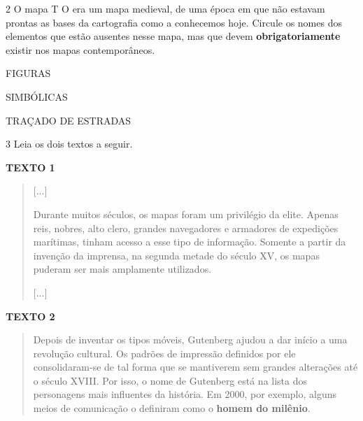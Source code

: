 \num{2} O mapa T O era um mapa medieval, de uma época em que não estavam prontas as
bases da cartografia como a conhecemos hoje. Circule os nomes dos elementos que estão ausentes nesse mapa, mas que devem
\textbf{obrigatoriamente} existir nos mapas contemporâneos.

\begin{multicols}{2}

FIGURAS


SIMBÓLICAS

TRAÇADO DE ESTRADAS
\end{multicols}


\num{3} Leia os dois textos a seguir.

\textbf{TEXTO 1}
\begin{quote}

{[}...{]}

Durante muitos séculos, os mapas foram um privilégio da elite.
Apenas reis, nobres, alto clero, grandes navegadores e armadores de
expedições marítimas, tinham acesso a esse tipo de informação. Somente a
partir da invenção da imprensa, na segunda metade do século XV, os mapas
puderam ser mais amplamente utilizados.

{[}...{]}

\end{quote}

\textbf{TEXTO 2}
\begin{quote}

Depois de inventar os tipos móveis, Gutenberg ajudou a dar início
a uma revolução cultural. Os padrões de impressão definidos por ele
consolidaram-se de tal forma que se mantiverem sem grandes alterações
até o século XVIII. Por isso, o nome de Gutenberg está na lista dos
personagens mais influentes da história. Em 2000, por exemplo, alguns
meios de comunicação o definiram como o \textbf{homem do milênio}.

\end{quote}

